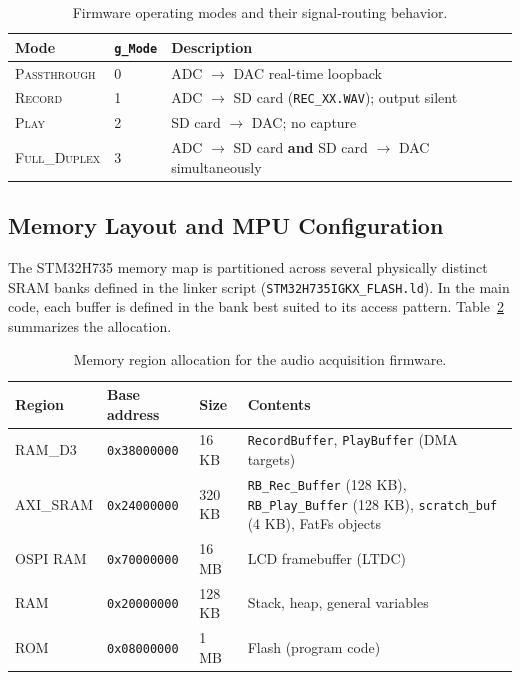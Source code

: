 \begin{table}[h!]
  \centering
  \caption{Firmware operating modes and their signal-routing behavior.}
  \label{tab:modes}
  \begin{tabular}{|l|l|p{7.5cm}|}
    \hline
    \textbf{Mode} & \textbf{\texttt{g\_Mode}} & \textbf{Description} \\
    \hline
    \textsc{Passthrough}  & 0 & ADC $\rightarrow$ DAC real-time loopback \\ \hline
    \textsc{Record}       & 1 & ADC $\rightarrow$ SD card (\texttt{REC\_XX.WAV}); output silent \\ \hline
    \textsc{Play}         & 2 & SD card $\rightarrow$ DAC; no capture \\ \hline
    \textsc{Full\_Duplex} & 3 & ADC $\rightarrow$ SD card \textbf{and} SD card $\rightarrow$ DAC simultaneously \\ 
    \hline
  \end{tabular}
\end{table}

\subsection{Memory Layout and MPU Configuration}

The STM32H735 memory map is partitioned across several physically distinct SRAM banks defined in the linker script (\texttt{STM32H735IGKX\_FLASH.ld}). In the main code, each buffer is defined in the bank best suited to its access pattern. Table~\ref{tab:memory} summarizes the allocation.

\begin{table}[h!]
  \centering
  \caption{Memory region allocation for the audio acquisition firmware.}
  \label{tab:memory}
  \begin{tabular}{|l|l|l|p{5.5cm}|}
    \hline
    \textbf{Region} & \textbf{Base address} & \textbf{Size} & \textbf{Contents} \\
    \hline
    RAM\_D3   & \texttt{0x38000000} & 16 KB  & \texttt{RecordBuffer}, \texttt{PlayBuffer} (DMA targets) \\
    \hline
    AXI\_SRAM & \texttt{0x24000000} & 320 KB & \texttt{RB\_Rec\_Buffer} (128 KB), \texttt{RB\_Play\_Buffer} (128 KB), \texttt{scratch\_buf} (4 KB), FatFs objects \\\hline
    OSPI RAM  & \texttt{0x70000000} & 16 MB  & LCD framebuffer (LTDC) \\\hline
    RAM       & \texttt{0x20000000} & 128 KB & Stack, heap, general variables \\\hline
    ROM       & \texttt{0x08000000} & 1 MB   & Flash (program code) \\
    \hline
  \end{tabular}
\end{table}

